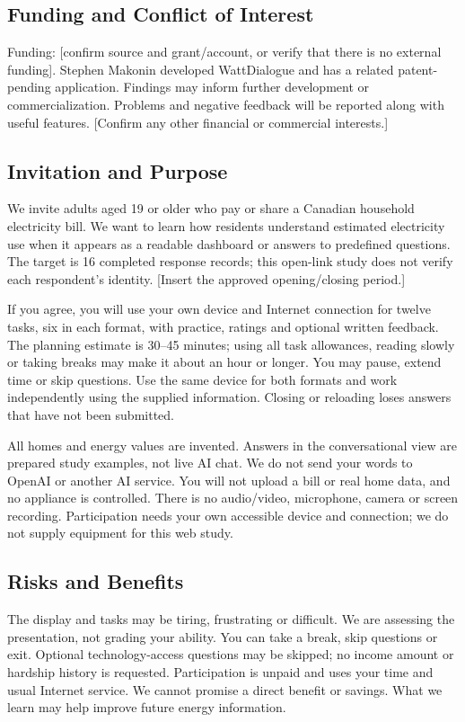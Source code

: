 \documentclass[11pt,letterpaper]{article}
\begin{document}
\subsection*{Funding and Conflict of Interest}
Funding: [confirm source and grant/account, or verify that there is no external funding]. Stephen Makonin developed WattDialogue and has a related patent-pending application. Findings may inform further development or commercialization. Problems and negative feedback will be reported along with useful features. [Confirm any other financial or commercial interests.]

\subsection*{Invitation and Purpose}
We invite adults aged 19 or older who pay or share a Canadian household electricity bill. We want to learn how residents understand estimated electricity use when it appears as a readable dashboard or answers to predefined questions. The target is 16 completed response records; this open-link study does not verify each respondent's identity. [Insert the approved opening/closing period.]

If you agree, you will use your own device and Internet connection for twelve tasks, six in each format, with practice, ratings and optional written feedback. The planning estimate is 30--45 minutes; using all task allowances, reading slowly or taking breaks may make it about an hour or longer. You may pause, extend time or skip questions. Use the same device for both formats and work independently using the supplied information. Closing or reloading loses answers that have not been submitted.

All homes and energy values are invented. Answers in the conversational view are prepared study examples, not live AI chat. We do not send your words to OpenAI or another AI service. You will not upload a bill or real home data, and no appliance is controlled. There is no audio/video, microphone, camera or screen recording. Participation needs your own accessible device and connection; we do not supply equipment for this web study.

\subsection*{Risks and Benefits}
The display and tasks may be tiring, frustrating or difficult. We are assessing the presentation, not grading your ability. You can take a break, skip questions or exit. Optional technology-access questions may be skipped; no income amount or hardship history is requested. Participation is unpaid and uses your time and usual Internet service. We cannot promise a direct benefit or savings. What we learn may help improve future energy information.
\end{document}
